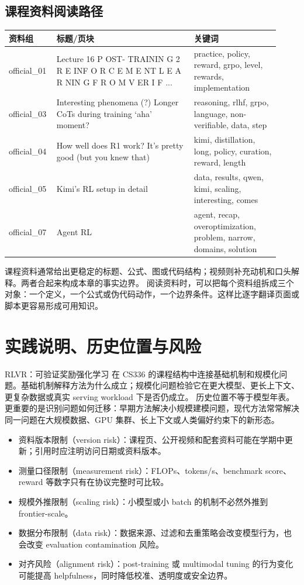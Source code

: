 \documentclass[a4paper]{article}
\begin{document}
\subsection{课程资料阅读路径}
\begin{longtable}{p{0.14\linewidth}p{0.48\linewidth}p{0.30\linewidth}}
\toprule
\textbf{资料组} & \textbf{标题/页块} & \textbf{关键词}\\
\midrule
official\_01 & Lecture 16 P OST- TRAININ G 2 R E INF O R C E M E NT L E A R NIN G F R O M V ER I F ... & practice, policy, reward, grpo, level, rewards, implementation\\
official\_03 & Interesting phenomena (?) Longer CoTs during training ‘aha’ moment? & reasoning, rlhf, grpo, language, non-verifiable, data, step\\
official\_04 & How well does R1 work? It’s pretty good (but you knew that) & kimi, distillation, long, policy, curation, reward, length\\
official\_05 & Kimi’s RL setup in detail & data, results, qwen, kimi, scaling, interesting, comes\\
official\_07 & Agent RL & agent, recap, overoptimization, problem, narrow, domains, solution\\
\bottomrule
\end{longtable}
课程资料通常给出更稳定的标题、公式、图或代码结构；视频则补充动机和口头解释。两者合起来构成本章的事实边界。
阅读资料时，可以把每个资料组拆成三个对象：一个定义，一个公式或伪代码动作，一个边界条件。这样比逐字翻译页面或脚本更容易形成可用知识。
\section{实践说明、历史位置与风险}
RLVR：可验证奖励强化学习 在 CS336 的课程结构中连接基础机制和规模化问题。基础机制解释方法为什么成立；规模化问题检验它在更大模型、更长上下文、更复杂数据或真实 serving workload 下是否仍成立。
历史位置不等于模型年表。更重要的是识别问题如何迁移：早期方法解决小规模建模问题，现代方法常常解决同一问题在大规模数据、GPU 集群、长上下文或人类偏好约束下的新形态。
\begin{itemize}
\item 资料版本限制（version risk）：课程页、公开视频和配套资料可能在学期中更新；引用时应注明访问日期或资料版本。
\item 测量口径限制（measurement risk）：FLOPs、tokens/s、benchmark score、reward 等数字只有在协议完整时可比较。
\item 规模外推限制（scaling risk）：小模型或小 batch 的机制不必然外推到 frontier-scale。
\item 数据分布限制（data risk）：数据来源、过滤和去重策略会改变模型行为，也会改变 evaluation contamination 风险。
\item 对齐风险（alignment risk）：post-training 或 multimodal tuning 的行为变化可能提高 helpfulness，同时降低校准、透明度或安全边界。
\end{itemize}
\end{document}
